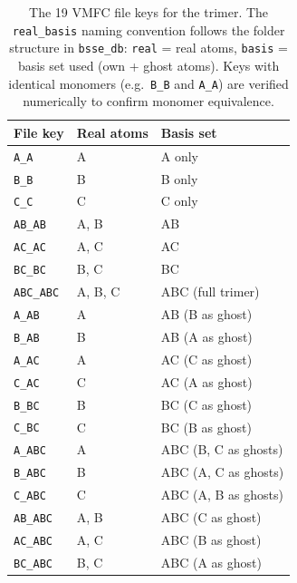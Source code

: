 \begin{table}[!ht]
    \centering
    \caption{The 19 VMFC file keys for the  trimer. The
    \texttt{real\_basis} naming convention follows the folder structure
    in \texttt{bsse\_db}: \texttt{real} = real atoms, \texttt{basis} =
    basis set used (own + ghost atoms). Keys with identical monomers
    (e.g.\ \texttt{B\_B} and \texttt{A\_A}) are verified numerically
    to confirm monomer equivalence.}
    \label{tab:h2o_trimer_filekeys}
    \small
    \begin{tabular}{lll}
        \toprule
        File key & Real atoms & Basis set \\
        \midrule
        \texttt{A\_A}    & A     & A only \\
        \texttt{B\_B}    & B     & B only \\
        \texttt{C\_C}    & C     & C only \\
        \texttt{AB\_AB}  & A, B  & AB \\
        \texttt{AC\_AC}  & A, C  & AC \\
        \texttt{BC\_BC}  & B, C  & BC \\
        \texttt{ABC\_ABC}& A, B, C & ABC (full trimer) \\
        \texttt{A\_AB}   & A     & AB (B as ghost) \\
        \texttt{B\_AB}   & B     & AB (A as ghost) \\
        \texttt{A\_AC}   & A     & AC (C as ghost) \\
        \texttt{C\_AC}   & C     & AC (A as ghost) \\
        \texttt{B\_BC}   & B     & BC (C as ghost) \\
        \texttt{C\_BC}   & C     & BC (B as ghost) \\
        \texttt{A\_ABC}  & A     & ABC (B, C as ghosts) \\
        \texttt{B\_ABC}  & B     & ABC (A, C as ghosts) \\
        \texttt{C\_ABC}  & C     & ABC (A, B as ghosts) \\
        \texttt{AB\_ABC} & A, B  & ABC (C as ghost) \\
        \texttt{AC\_ABC} & A, C  & ABC (B as ghost) \\
        \texttt{BC\_ABC} & B, C  & ABC (A as ghost) \\
        \bottomrule
    \end{tabular}
\end{table}

